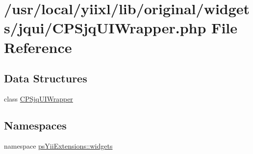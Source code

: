 \hypertarget{CPSjqUIWrapper_8php}{
\section{/usr/local/yiixl/lib/original/widgets/jqui/CPSjqUIWrapper.php File Reference}
\label{CPSjqUIWrapper_8php}
}
\subsection*{Data Structures}
\begin{DoxyCompactItemize}
\item 
class \hyperlink{classCPSjqUIWrapper}{CPSjqUIWrapper}
\end{DoxyCompactItemize}
\subsection*{Namespaces}
\begin{DoxyCompactItemize}
\item 
namespace \hyperlink{namespacepsYiiExtensions_1_1widgets}{psYiiExtensions::widgets}
\end{DoxyCompactItemize}

